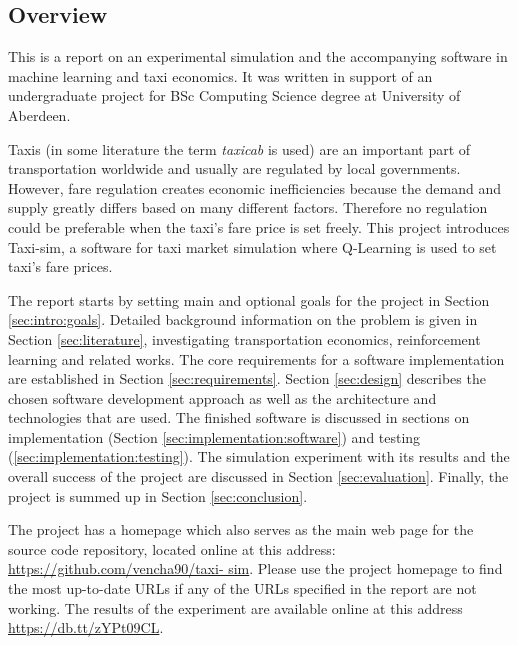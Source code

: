 \subsection{Overview}
\label{sec:intro:overview}

This is a report on an experimental simulation and the accompanying software in
machine learning and taxi economics. It was written in support of an
undergraduate project for BSc Computing Science degree at University of
Aberdeen.

Taxis (in some literature the term \textit{taxicab} is used) are an important
part of transportation worldwide and usually are regulated by local
governments. However, fare regulation creates economic inefficiencies because
the demand and supply greatly differs based on many different factors.
Therefore no regulation could be preferable when the taxi's fare price is set
freely. This project introduces Taxi-sim, a software for taxi market simulation
where Q-Learning is used to set taxi's fare prices.

The report starts by setting main and optional goals for the project in Section
\ref{sec:intro:goals}. Detailed background information on the problem is given
in Section \ref{sec:literature}, investigating transportation economics,
reinforcement learning and related works. The core requirements for a software
implementation are established in Section \ref{sec:requirements}. Section
\ref{sec:design} describes the chosen software development approach as well as
the architecture and technologies that are used. The finished software is
discussed in sections on implementation (Section
\ref{sec:implementation:software}) and testing
(\ref{sec:implementation:testing}). The simulation experiment with its results
and the overall success of the project are discussed in Section
\ref{sec:evaluation}. Finally, the project is summed up in Section
\ref{sec:conclusion}.

The project has a homepage which also serves as the main web page for the
source code repository, located online at this address:
\url{https://github.com/vencha90/taxi- sim}. Please use the project homepage to
find the most up-to-date URLs if any of the URLs specified in the report are
not working. The results of the experiment are available online at this address
\url{https://db.tt/zYPt09CL}.
